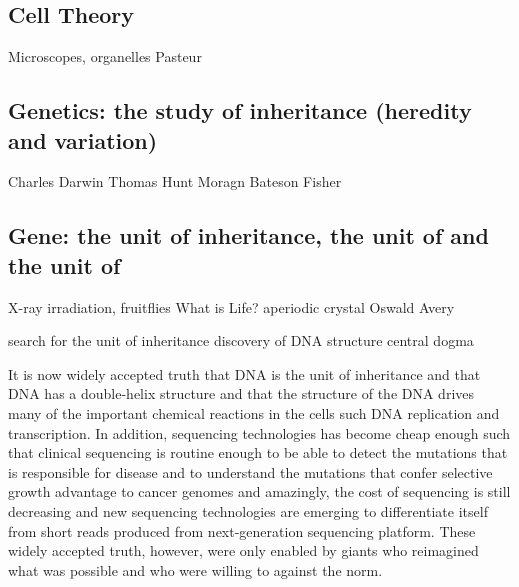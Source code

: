 \subsection{Cell Theory}

Microscopes, organelles
Pasteur


\subsection{Genetics: the study of inheritance (heredity and variation)}
Charles Darwin
Thomas Hunt Moragn
Bateson
Fisher



\subsection{Gene: the unit of inheritance, the unit of and the unit of }

X-ray irradiation, fruitflies
What is Life? aperiodic crystal
Oswald Avery

search for the unit of inheritance
discovery of DNA structure
central dogma

It is now widely accepted truth that DNA is the unit of inheritance and that DNA has a double-helix structure and that the structure of the DNA drives many of the important chemical reactions in the cells such DNA replication and transcription. In addition, sequencing technologies has become cheap enough such that clinical sequencing is routine enough to be able to detect the mutations that is responsible for disease and to understand the mutations that confer selective growth advantage to cancer genomes and amazingly, the cost of sequencing is still decreasing and new sequencing technologies are emerging to differentiate itself from short reads produced from next-generation sequencing platform. These widely accepted truth, however, were only enabled by giants who reimagined what was possible and who were willing to against the norm. 
 
